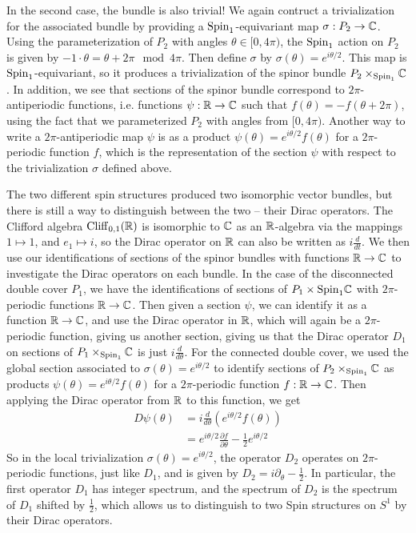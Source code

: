 \begin{exmp}
In the second case, the bundle is also trivial! We again contruct a trivialization
for the associated bundle by providing a $\mathrm{Spin}_1$-equivariant map
$\sigma : P_2 \to \mathbb{C}$. Using the parameterization of $P_2$ with angles
$\theta \in [0,4\pi)$, the $\mathrm{Spin}_1$ action on $P_2$ is given by
$-1 \cdot \theta = \theta + 2\pi \mod 4\pi$. Then define $\sigma$ by
$\sigma(\theta) = e^{i\theta/2}$. This map is $\mathrm{Spin}_1$-equivariant, so
it produces a trivialization of the spinor bundle $P_2 \times_{\mathrm{Spin}_1} \mathbb{C}$.
In addition, we see that sections of the spinor bundle correspond
to $2\pi$-antiperiodic functions, i.e. functions $\psi : \mathbb{R} \to \mathbb{C}$ such that
$f(\theta) = -f(\theta + 2\pi)$, using the fact that we parameterized $P_2$
with angles from $[0, 4\pi)$. Another way to write a $2\pi$-antiperiodic map
$\psi$ is as a product $\psi(\theta) = e^{i\theta/2}f(\theta)$ for a $2\pi$-periodic
function $f$, which is the representation of the section $\psi$ with respect to the
trivialization $\sigma$ defined above.

The two different spin structures produced two isomorphic vector bundles,
but there is still a way to distinguish between the two -- their Dirac operators.
The Clifford algebra $\operatorname{Cliff}_{0,1}(\mathbb{R})$ is isomorphic to $\mathbb{C}$ as an $\mathbb{R}$-algebra
via the mappings $1 \mapsto 1$, and $e_1 \mapsto i$, so the Dirac operator on
$\mathbb{R}$ can also be written as $i \frac{d}{dt}$. We then use our identifications
of sections of the spinor bundles with functions $\mathbb{R} \to \mathbb{C}$ to investigate the
Dirac operators on each bundle. In the case of the disconnected double cover $P_1$,
we have the identifications of sections of $P_1 \times{\mathrm{Spin}_1} \mathbb{C}$ with
$2\pi$-periodic functions $\mathbb{R} \to \mathbb{C}$. Then given a section $\psi$, we
can identify it as a function $\mathbb{R} \to \mathbb{C}$, and use the Dirac operator in $\mathbb{R}$,
which will again be a $2\pi$-periodic function, giving us another section,
giving us that the Dirac operator $D_1$ on sections of $P_1 \times_{\mathrm{Spin}_1} \mathbb{C}$
is just $i\frac{d}{d\theta}$. For the connected double cover, we used the
global section associated to $\sigma(\theta) = e^{i\theta /2}$ to identify
sections of $P_2 \times_{\mathrm{Spin}_1} \mathbb{C}$ as products
$\psi(\theta) = e^{i\theta/2}f(\theta)$ for a $2\pi$-periodic function $f : \mathbb{R} \to \mathbb{C}$.
Then applying the Dirac operator from $\mathbb{R}$ to this function, we get
%
\begin{align*}
D\psi(\theta) &= i\frac{d}{d\theta}\left( e^{i\theta/2}f(\theta) \right) \\
&= e^{i\theta/2}\frac{\partial f}{\partial \theta} - \frac{1}{2}e^{i\theta/2}
\end{align*}
%
So in the local trivialization $\sigma(\theta) = e^{i\theta/2}$, the operator $D_2$
operates on $2\pi$-periodic functions, just like $D_1$, and is given by
$D_2 = i\partial_\theta - \frac{1}{2}$. In particular, the first operator $D_1$ has
integer spectrum, and the spectrum of $D_2$ is the spectrum of $D_1$ shifted by
$\frac{1}{2}$, which allows us to distinguish to two Spin structures on $S^1$
by their Dirac operators.
%
\end{exmp}
